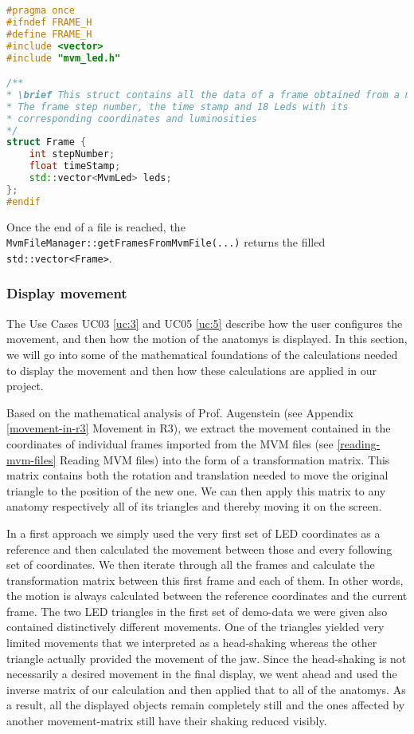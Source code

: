 \begin{lstlisting}[language=C++,caption={Frame class}, label={code:frame}]
#pragma once
#ifndef FRAME_H
#define FRAME_H
#include <vector>
#include "mvm_led.h"

/**
* \brief This struct contains all the data of a frame obtained from a mvm file. 
* The frame step number, the time stamp and 18 Leds with its 
* corresponding coordinates and luminosities
*/
struct Frame {
	int stepNumber;
	float timeStamp;
	std::vector<MvmLed> leds;
};
#endif
\end{lstlisting}

\noindent Once the end of a file is reached, the \verb|MvmFileManager::getFramesFromMvmFile(...)| returns the filled \verb|std::vector<Frame>|.


\subsubsection{Display movement}

The Use Cases UC03 \ref{uc:3} and UC05 \ref{uc:5} describe how the user configures the movement, and then how the motion of the \glspl{anatomy} is displayed. In this section, we will go into some of the mathematical foundations of the calculations needed to display the movement and then how these calculations are applied in our project.


 \label{movement-calculations}

Based on the mathematical analysis of Prof. Augenstein (see Appendix \ref{movement-in-r3} Movement in R3), we extract the movement contained in the coordinates of individual frames imported from the \gls{MVM}  files (see \ref{reading-mvm-files} Reading MVM files) into the form of a transformation matrix. This matrix contains both the rotation and translation needed to move the original triangle to the position of the new one. We can then apply this matrix to any \gls{anatomy} respectively all of its triangles and thereby moving it on the screen.

In a first approach we simply used the very first set of LED coordinates as a reference and then calculated the movement between those and every following set of coordinates. We then iterate through all the frames and calculate the transformation matrix between this first frame and each of them. In other words, the motion is always calculated between the reference coordinates and the current frame.
The two LED triangles in the first set of demo-data we were given also contained distinctively different movements. One of the triangles yielded very limited movements that we interpreted as a head-shaking whereas the other triangle actually provided the movement of the jaw.
Since the head-shaking is not necessarily a desired movement in the final display, we went ahead and used the inverse matrix of our calculation and then applied that to all of the \gls{anatomy}s. As a result, all the displayed objects remain completely still and the ones affected by another movement-matrix still have their shaking reduced visibly.

